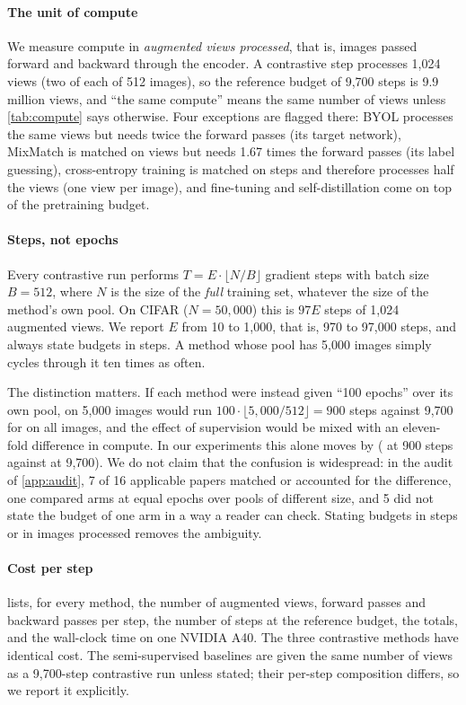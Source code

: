 \paragraph{The unit of compute}
We measure compute in \emph{augmented views processed}, that is, images passed forward and backward through the
encoder. A contrastive step processes 1,024 views (two of each of 512 images), so the reference budget of
9,700 steps is 9.9 million views, and ``the same compute'' means the same number of views unless
\cref{tab:compute} says otherwise. Four exceptions are flagged there: BYOL processes the same views but needs
twice the forward passes (its target network), MixMatch is matched on views but needs 1.67 times the forward
passes (its label guessing), cross-entropy training is matched on steps and therefore processes half the
views (one view per image), and fine-tuning and self-distillation come on top of the pretraining budget.

\paragraph{Steps, not epochs}
Every contrastive run performs $T=E\cdot\lfloor N/B\rfloor$ gradient steps with batch size $B=512$, where $N$
is the size of the \emph{full} training set, whatever the size of the method's own pool. On CIFAR
($N=50{,}000$) this is $97E$ steps of 1,024 augmented views. We report $E$ from 10 to 1,000, that is, 970 to
97,000 steps, and always state budgets in steps. A method whose pool has 5,000 images simply cycles through
it ten times as often.

The distinction matters. If each method were instead given ``100 epochs'' over its own pool, \supcon on
5,000 images would run $100\cdot\lfloor 5{,}000/512\rfloor = 900$ steps against 9,700 for \simclr on all
images, and the effect of supervision would be mixed with an eleven-fold difference in compute. In our
experiments this alone moves \supcon by \pt ( at 900 steps
against  at 9,700). We do not claim that the confusion is widespread: in the
audit of \ref{app:audit}, 7 of 16 applicable papers matched or accounted for the difference, one compared
arms at equal epochs over pools of different size, and 5 did not state the budget of one arm in a way a
reader can check. Stating budgets in steps or in images processed removes the ambiguity.

\paragraph{Cost per step}
 lists, for every method, the number of augmented views, forward passes and backward
passes per step, the number of steps at the reference budget, the totals, and the wall-clock time on one
NVIDIA A40. The three contrastive methods have identical cost. The semi-supervised baselines are given the
same number of views as a 9,700-step contrastive run unless stated; their per-step composition differs, so
we report it explicitly.

